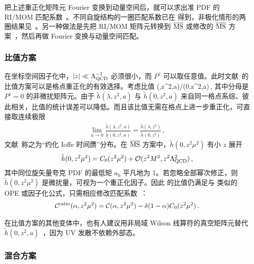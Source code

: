 把上述重正化矩阵元 Fourier 变换到动量空间后，就可以求出准 PDF 的 RI/MOM 匹配系数~\cite{Stewart:2017tvs}。不同自旋结构的一圈匹配系数已在 \cite{Stewart:2017tvs,Liu:2018uuj,Liu:2018hxv} 得到，非极化情形的两圈结果见~\cite{Chen:2020ody}。另一种做法是先把 RI/MOM 矩阵元转换到 ${\overline{\rm MS}}$ 或修改的 ${\overline{\rm MS}}$ 方案~\cite{Constantinou:2017sej,Alexandrou:2019lfo}，然后再做 Fourier 变换与动量空间匹配。

\subsubsection{比值方案}
\label{sec:renorm-npr-ratio}

在坐标空间因子化中，$|z|\ll \Lambda^{-1}_{\rm QCD}$ 必须很小，而 $P^z$ 可以取任意值。此时文献~\cite{Radyushkin:2017cyf,Orginos:2017kos}的比值方案可以是格点重正化的有效选择。考虑比值
\beq \label{eq:ratio}
(\lambda,z^2,a)/(0,z^2,a)\,,
\eeq
其中分母是 $P^z=0$ 的非微扰矩阵元。由于 $\tilde{h}(\lambda,z^2,a)$ 与 $\tilde{h}(0,z^2,a)$ 来自同一格点系综、彼此相关，比值的统计误差可以降低。而且该比值无需在格点上进一步重正化，可直接取连续极限
\begin{align} \label{eq:ratio1}
	\lim_{a\to0}\frac{\tilde{h}(\lambda,z^2,a)}{\tilde{h}(0,z^2,a)} = \frac{\tilde{h}(\lambda,z^2)}{\tilde{h}(0,z^2)}\,,
\end{align}
文献~\cite{Radyushkin:2017cyf,Orginos:2017kos}称之为``约化 Ioffe 时间赝''分布。在 ${\overline{\rm MS}}$ 方案中，$\tilde{h}(0,z^2\mu^2)$ 有小 $z$ 展开
\begin{align}
	\tilde{h}(0,z^2\mu^2) = C_0(z^2\mu^2) + {\cal O}(z^2M^2, z^2\Lambda_{\rm QCD}^2)\,,
\end{align}
其中同位旋矢量夸克 PDF 的最低矩 $a_0$ 平凡地为 1。若忽略全部幂次修正，则 $\tilde{h}(0,z^2\mu^2)$ 是微扰量，可视为一个重正化因子。因此  的比值仍满足与  类似的 OPE 或因子化公式，只需相应修改匹配系数~\cite{Radyushkin:2017lvu,Izubuchi:2018srq}：
\begin{align}
	{\cal C}^{\rm ratio}(\alpha,z^2\mu^2)= {\cal C}(\alpha,z^2\mu^2) - \delta(1-\alpha)C_0(z^2\mu^2)\,.
\end{align}

在比值方案的其他变体中，也有人建议用非局域 Wilson 线算符的真空矩阵元替代 $\tilde{h}(0,z^2,a)$~\cite{Braun:2018brg,Li:2020xml}，因为 UV 发散不依赖外部态。


\subsubsection{混合方案}
\label{sec:hybrid}

